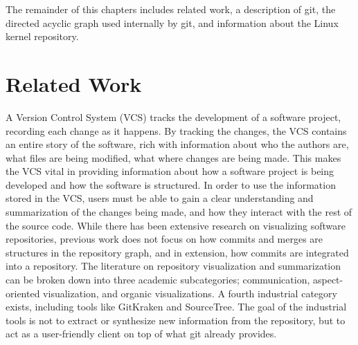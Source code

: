 The remainder of this chapters includes related work, a description of
git, the directed acyclic graph used internally by git, and information
about the Linux kernel repository.

\section{Related Work}\label{sec:related_work}

A Version Control System (VCS) tracks the development of a software project,
recording each change as it happens. By tracking the changes, the VCS
contains an entire story of the software, rich with information about
who the authors are, what files are being modified, what where changes
are being made. This makes the VCS vital in providing information about
how a software project is being developed and how the software is
structured. In order to use the information stored in the VCS, users
must be able to gain a clear understanding and summarization of the
changes being made, and how they interact with the rest of the source
code. While there has been extensive research on visualizing software
repositories, previous work does not focus on how commits and merges are
structures in the repository graph, and in extension, how commits are
integrated into a repository. The literature on repository visualization
and summarization can be broken down into three academic subcategories;
communication\cite{Cubranic2005,Begel2010}, aspect-oriented
visualization\cite{Ambros2005,Burch2005,Ambros2009}, and organic
visualizations\cite{ogawa09,Caudwell2010}. A fourth industrial category
exists, including tools like GitKraken and SourceTree. The goal of the
industrial tools is not to extract or synthesize new information from
the repository, but to act as a user-friendly client on top of what git
already provides.


